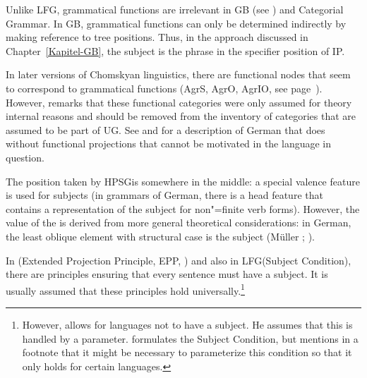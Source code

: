Unlike LFG, grammatical functions are irrelevant in GB (see \citealp{Williams84a,Sternefeld85a}) and Categorial Grammar\indexcg. In GB, grammatical functions can only be
determined indirectly by making reference to tree positions. Thus, in the approach discussed in
Chapter~\ref{Kapitel-GB}, the subject is the phrase in the specifier position of IP.

In later versions of Chomskyan linguistics, there are functional nodes that seem to correspond to
grammatical functions (AgrS, AgrO,
AgrIO, see page~\pageref{Seite-AgrO}). However,
\citet[Section~4.10.1]{Chomsky95a-u} remarks that these functional categories were only assumed for
theory internal reasons and should be removed from the inventory of categories that are assumed to
be part of UG. See  and  for a description
of German that does without functional projections that cannot be motivated in the language in question.

\addlines[2]
The position taken by HPSG\indexhpsg is somewhere in the middle: a special valence feature is used
for subjects (in grammars of German, there is a head feature that contains a representation of the
subject for non"=finite verb forms). However, the value of the \subjf is derived from more general
theoretical considerations: in German, the least oblique element with structural
case is the subject (Müller \citeyear[]{Mueller2002b}; \citeyear[]{MuellerLehrbuch1}).

In \gbt (Extended Projection Principle, EPP, ) and also in LFG\indexlfg (Subject Condition), there are principles
ensuring that every sentence must have a subject. It is usually assumed that these principles hold universally.\footnote{%
  However, \citet[]{Chomsky81a} allows for languages not to have a subject. He assumes that this is handled by a parameter.
 \citet[]{Bresnan2001a} formulates the Subject Condition, but mentions in a footnote that it might be necessary
to parameterize this condition so that it only holds for certain languages.%
} 
  
